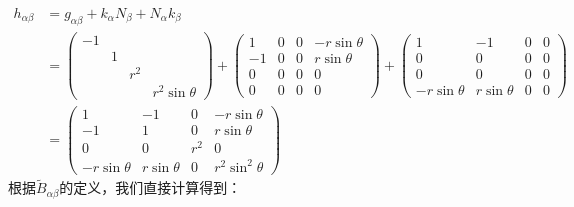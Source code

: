 \documentclass[hyperref, UTF8, a4paper]{ctexart}
\begin{document}
\begin{equation*}
	\begin{aligned}
		h_{\alpha \beta } & =g_{\alpha \beta } +k_{\alpha } N_{\beta } +N_{\alpha } k_{\beta }\\
		& =\begin{pmatrix}
			-1 &  &  & \\
			& 1 &  & \\
			&  & r^{2} & \\
			&  &  & r^{2}\sin \theta 
		\end{pmatrix} +\begin{pmatrix}
			1 & 0 & 0 & -r\sin \theta \\
			-1 & 0 & 0 & r\sin \theta \\
			0 & 0 & 0 & 0\\
			0 & 0 & 0 & 0
		\end{pmatrix} +\begin{pmatrix}
			1 & -1 & 0 & 0\\
			0 & 0 & 0 & 0\\
			0 & 0 & 0 & 0\\
			-r\sin \theta  & r\sin \theta  & 0 & 0
		\end{pmatrix}\\
		& =\begin{pmatrix}
			1 & -1 & 0 & -r\sin \theta \\
			-1 & 1 & 0 & r\sin \theta \\
			0 & 0 & r^{2} & 0\\
			-r\sin \theta  & r\sin \theta  & 0 & r^{2}\sin^{2} \theta 
		\end{pmatrix}
	\end{aligned}
\end{equation*}
根据$\tilde{B}_{\alpha \beta }$的定义，我们直接计算得到：
\end{document}
